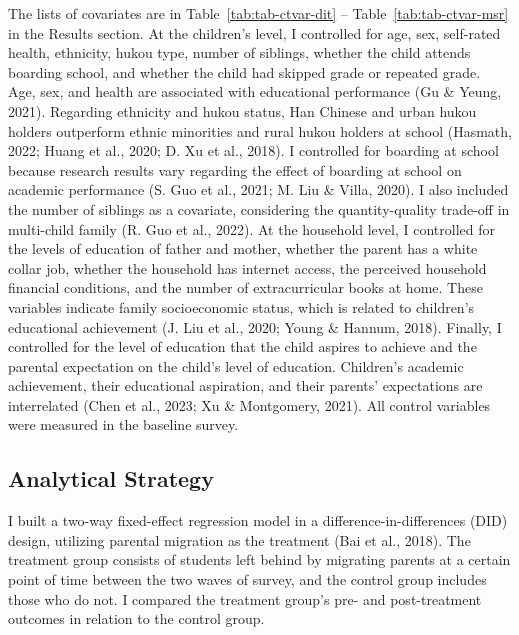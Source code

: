\documentclass[
  man,floatsintext]{apa7}
\begin{document}
The lists of covariates are in Table~\ref{tab:tab-ctvar-dit} -- Table~\ref{tab:tab-ctvar-msr} in the Results section. At the children's level, I controlled for age, sex, self-rated health, ethnicity, hukou type, number of siblings, whether the child attends boarding school, and whether the child had skipped grade or repeated grade. Age, sex, and health are associated with educational performance (Gu \& Yeung, 2021). Regarding ethnicity and hukou status, Han Chinese and urban hukou holders outperform ethnic minorities and rural hukou holders at school (Hasmath, 2022; Huang et al., 2020; D. Xu et al., 2018). I controlled for boarding at school because research results vary regarding the effect of boarding at school on academic performance (S. Guo et al., 2021; M. Liu \& Villa, 2020). I also included the number of siblings as a covariate, considering the quantity-quality trade-off in multi-child family (R. Guo et al., 2022). At the household level, I controlled for the levels of education of father and mother, whether the parent has a white collar job, whether the household has internet access, the perceived household financial conditions, and the number of extracurricular books at home. These variables indicate family socioeconomic status, which is related to children's educational achievement (J. Liu et al., 2020; Young \& Hannum, 2018). Finally, I controlled for the level of education that the child aspires to achieve and the parental expectation on the child's level of education. Children's academic achievement, their educational aspiration, and their parents' expectations are interrelated (Chen et al., 2023; Xu \& Montgomery, 2021). All control variables were measured in the baseline survey.

\hypertarget{analytical-strategy}{%
\subsection{Analytical Strategy}\label{analytical-strategy}}

I built a two-way fixed-effect regression model in a difference-in-differences (DID) design, utilizing parental migration as the treatment (Bai et al., 2018). The treatment group consists of students left behind by migrating parents at a certain point of time between the two waves of survey, and the control group includes those who do not. I compared the treatment group's pre- and post-treatment outcomes in relation to the control group.
\end{document}
